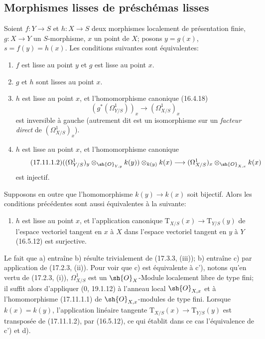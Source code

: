 \subsection{Morphismes lisses de préschémas lisses}
\label{subsection:IV.17.11}

\begin{theorem}[17.11.1]
\label{IV.17.11.1}
Soient $f:Y\to S$ et $h:X\to S$ deux morphismes localement de présentation finie, $g:X\to Y$ un $S$-morphisme, $x$ un point de $X$; posons $y=g(x)$, $s=f(y)=h(x)$. Les conditions suivantes sont équivalentes:
\begin{enumerate}
  \item[a)] $f$ est lisse au point $y$ et $g$ est lisse au point $x$.
  \item[b)] $g$ et $h$ sont lisses au point $x$.
  \item[c)] $h$ est lisse au point $x$, et l'homomorphisme canonique (16.4.18)
  \begin{equation}
  \label{IV.17.11.1.1}
  \tag{17.11.1.1}
  (g^*(\Omega^1_{Y/S}))_x\to(\Omega^1_{X/S})_x
  \end{equation}
  est inversible à gauche (autrement dit est un isomorphisme sur un \emph{facteur direct} de $(\Omega^1_{X/S})_x$).
  \item[c')] $h$ est lisse au point $x$, et l'homomorphisme canonique
  \begin{equation}
  \label{IV.17.11.1.2}
  \tag{17.11.1.2}
  ((\Omega^1_{Y/S})_y\otimes_{\sh{O}_{Y,y}}k(y))\otimes_{k(y)}k(x)\to(\Omega^1_{X/S})_x\otimes_{\sh{O}_{X,x}}k(x)
  \end{equation}
  est injectif.
\end{enumerate}
Supposons en outre que l'homomorphisme $k(y)\to k(x)$ soit bijectif. Alors les conditions précédentes sont aussi équivalentes à la suivante:
\begin{enumerate}
  \item[d)] $h$ est lisse au point $x$, et l'application canonique $\mathrm{T}_{X/S}(x)\to\mathrm{T}_{Y/S}(y)$ de l'espace vectoriel tangent en $x$ à $X$ dans l'espace vectoriel tangent en $y$ à $Y$ (16.5.12) est surjective.
\end{enumerate}
\end{theorem}

Le fait que a) entraîne b) résulte trivialement de (17.3.3, (iii)); b) entraîne c) par application de (17.2.3, (ii)). Pour voir que c) est équivalente à c'), notons qu'en vertu de (17.2.3, (i)), $\Omega^1_{X/S}$ est un $\sh{O}_X$-Module localement libre de type fini; il suffit alors d'appliquer (0, 19.1.12) à l'anneau local $\sh{O}_{X,x}$ et à l'homomorphisme (17.11.1.1) de $\sh{O}_{X,x}$-modules de type fini. Lorsque $k(x)=k(y)$, l'application linéaire tangente $\mathrm{T}_{X/S}(x)\to\mathrm{T}_{Y/S}(y)$ est transposée de (17.11.1.2), par (16.5.12), ce qui établit dans ce cas l'équivalence de c') et d).

